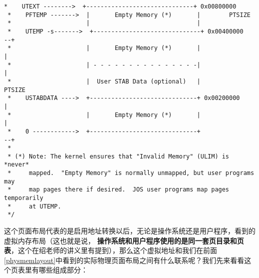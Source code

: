\documentclass{article}
\newcommand{\highlight}[1]{{\bfseries \color{red}  #1}}
\begin{document}
\begin{CJK*}{UTF8}{gkai}
\begin{lstlisting}[style=ccode, title={\scriptsize \ttfamily \bfseries inc/memlayout.h}]
 *    UTEXT -------->  +------------------------------+ 0x00800000
 *    PFTEMP ------->  |       Empty Memory (*)       |        PTSIZE
 *                     |                              |
 *    UTEMP -s------->  +------------------------------+ 0x00400000      --+
 *                     |       Empty Memory (*)       |                   |
 *                     | - - - - - - - - - - - - - - -|                   |
 *                     |  User STAB Data (optional)   |                 PTSIZE
 *    USTABDATA ---->  +------------------------------+ 0x00200000        |
 *                     |       Empty Memory (*)       |                   |
 *    0 ------------>  +------------------------------+                 --+
 *
 * (*) Note: The kernel ensures that "Invalid Memory" (ULIM) is *never*
 *     mapped.  "Empty Memory" is normally unmapped, but user programs may
 *     map pages there if desired.  JOS user programs map pages temporarily
 *     at UTEMP.
 */
\end{lstlisting}

这个页面布局代表的是启用地址转换以后，无论是操作系统还是用户程序，看到的虚拟内存布局（这也就是说，\highlight{操作系统和用户程序使用的是同一套页目录和页表}，这个在绍老师的讲义里有提到），那么这个虚拟地址和我们在前面\ref{physmemlayout}中看到的实际物理页面布局之间有什么联系呢？我们先来看看这个页表里有哪些组成部分：


\end{CJK*}
\end{document}
